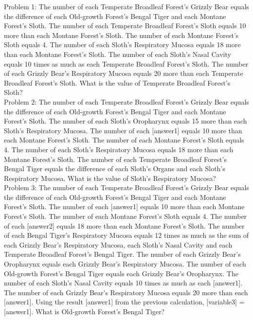 \begin{systemprompt}[title={Question}]


Problem 1: The number of each Temperate Broadleaf Forest's Grizzly Bear equals the difference of each Old-growth Forest's Bengal Tiger and each Montane Forest's Sloth. The number of each Temperate Broadleaf Forest's Sloth equals 10 more than each Montane Forest's Sloth. The number of each Montane Forest's Sloth equals 4. The number of each Sloth's Respiratory Mucosa equals 18 more than each Montane Forest's Sloth. The number of each Sloth's Nasal Cavity equals 10 times as much as each Temperate Broadleaf Forest's Sloth. The number of each Grizzly Bear's Respiratory Mucosa equals 20 more than each Temperate Broadleaf Forest's Sloth. What is the value of Temperate Broadleaf Forest's Sloth?\\

Problem 2: The number of each Temperate Broadleaf Forest's Grizzly Bear equals the difference of each Old-growth Forest's Bengal Tiger and each Montane Forest's Sloth. The number of each Sloth's Oropharynx equals 15 more than each Sloth's Respiratory Mucosa. The number of each [answer1] equals 10 more than each Montane Forest's Sloth. The number of each Montane Forest's Sloth equals 4. The number of each Sloth's Respiratory Mucosa equals 18 more than each Montane Forest's Sloth. The number of each Temperate Broadleaf Forest's Bengal Tiger equals the difference of each Sloth's Organs and each Sloth's Respiratory Mucosa. What is the value of Sloth's Respiratory Mucosa?\\

Problem 3: The number of each Temperate Broadleaf Forest's Grizzly Bear equals the difference of each Old-growth Forest's Bengal Tiger and each Montane Forest's Sloth. The number of each [answer1] equals 10 more than each Montane Forest's Sloth. The number of each Montane Forest's Sloth equals 4. The number of each [answer2] equals 18 more than each Montane Forest's Sloth. The number of each Bengal Tiger's Respiratory Mucosa equals 12 times as much as the sum of each Grizzly Bear's Respiratory Mucosa, each Sloth's Nasal Cavity and each Temperate Broadleaf Forest's Bengal Tiger. The number of each Grizzly Bear's Oropharynx equals each Grizzly Bear's Respiratory Mucosa. The number of each Old-growth Forest's Bengal Tiger equals each Grizzly Bear's Oropharynx. The number of each Sloth's Nasal Cavity equals 10 times as much as each [answer1]. The number of each Grizzly Bear's Respiratory Mucosa equals 20 more than each [answer1]. Using the result [answer1] from the previous calculation, [variable3] = [answer1]. What is Old-growth Forest's Bengal Tiger?\\


\end{systemprompt}
